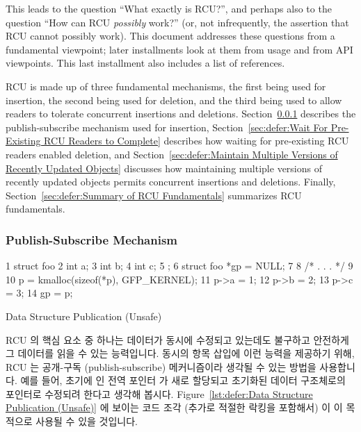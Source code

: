 This leads to the question ``What exactly is RCU?'', and perhaps also
to the question ``How can RCU \emph{possibly} work?'' (or, not
infrequently, the assertion that RCU cannot possibly work).
This document addresses these questions from a fundamental viewpoint;
later installments look at them from usage and from API viewpoints.
This last installment also includes a list of references.

RCU is made up of three fundamental mechanisms, the first being
used for insertion, the second being used for deletion, and the third
being used to allow readers to tolerate concurrent insertions and deletions.
Section~\ref{sec:defer:Publish-Subscribe Mechanism}
describes the publish-subscribe mechanism used for insertion,
Section~\ref{sec:defer:Wait For Pre-Existing RCU Readers to Complete}
describes how waiting for pre-existing RCU readers enabled deletion,
and
Section~\ref{sec:defer:Maintain Multiple Versions of Recently Updated Objects}
discusses how maintaining multiple versions of recently updated objects
permits concurrent insertions and deletions.
Finally,
Section~\ref{sec:defer:Summary of RCU Fundamentals}
summarizes RCU fundamentals.
\fi

\subsubsection{Publish-Subscribe Mechanism}
\label{sec:defer:Publish-Subscribe Mechanism}

\begin{listing}[tbp]
{ \scriptsize
\begin{verbbox}
  1 struct foo {
  2   int a;
  3   int b;
  4   int c;
  5 };
  6 struct foo *gp = NULL;
  7
  8 /* . . . */
  9
 10 p = kmalloc(sizeof(*p), GFP_KERNEL);
 11 p->a = 1;
 12 p->b = 2;
 13 p->c = 3;
 14 gp = p;
\end{verbbox}
}
\centering
\theverbbox
\caption{Data Structure Publication (Unsafe)}
\label{lst:defer:Data Structure Publication (Unsafe)}
\end{listing}

RCU 의 핵심 요소 중 하나는 데이터가 동시에 수정되고 있는데도 불구하고 안전하게
그 데이터를 읽을 수 있는 능력입니다.
동시의 항목 삽입에 이런 능력을 제공하기 위해, RCU 는 공개-구독
(publish-subscribe) 메커니즘이라 생각될 수 있는 방법을 사용합니다.
예를 들어, 초기에  인 전역 포인터  가 새로 할당되고 초기화된
데이터 구조체로의 포인터로 수정되려 한다고 생각해 봅시다.
Figure~\ref{lst:defer:Data Structure Publication (Unsafe)} 에 보이는 코드 조각
(추가로 적절한 락킹을 포함해서) 이 이 목적으로 사용될 수 있을 것입니다.
\iffalse

